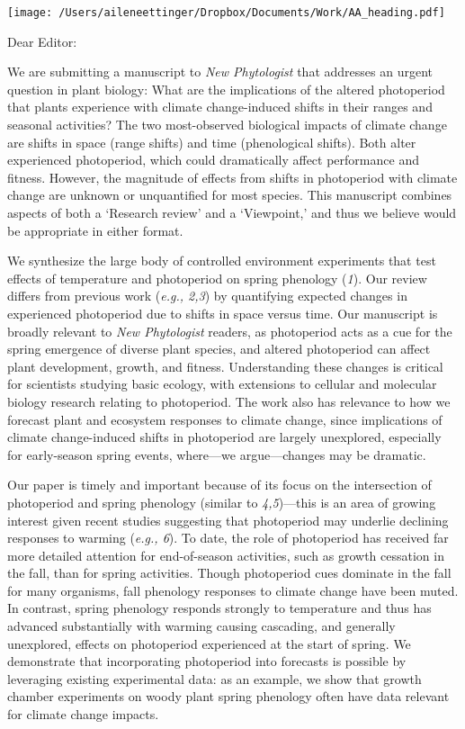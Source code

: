 \documentclass[10.5pt,a4paper]{letter}
\begin{document}
\begin{letter}{}
\texttt{[image: /Users/aileneettinger/Dropbox/Documents/Work/AA\_heading.pdf]}

\opening{Dear Editor:}
We are submitting a manuscript to \emph{New Phytologist} that addresses an urgent question in plant biology: What are the implications
of the altered photoperiod that plants experience with climate change-induced shifts in their ranges and seasonal activities? The two most-observed biological impacts of climate change are shifts in space (range shifts) and time (phenological shifts). Both alter experienced photoperiod, which could dramatically affect performance and fitness. However, the magnitude of effects from shifts in photoperiod with climate change are unknown or unquantified for most species. This manuscript combines aspects of both a `Research review' and a `Viewpoint,' and thus we believe would be appropriate in either format.
\par We synthesize the large body of controlled environment experiments that test effects of temperature and photoperiod on spring phenology (\emph{1}). Our review differs from previous work  (\emph{e.g., 2,3}) by quantifying expected changes in experienced photoperiod due to shifts in space versus time. Our manuscript is  broadly relevant to \emph{New Phytologist} readers, as photoperiod acts as a cue for the spring emergence of diverse plant species, and altered photoperiod can affect plant development, growth, and fitness. Understanding these changes is critical for scientists studying basic ecology, with extensions to cellular and molecular biology research relating to photoperiod. The work also has relevance to how we forecast plant and ecosystem responses to climate change, since implications of climate change-induced shifts in photoperiod are largely unexplored, especially for early-season spring events, where---we argue---changes may be dramatic.

\par Our paper is timely and important because of its focus on the intersection of photoperiod and spring phenology (similar to \emph{4,5})---this is an area of growing interest given recent studies suggesting that photoperiod may underlie declining responses to warming (\emph{e.g., 6}). To date, the role of photoperiod has received far more detailed attention for end-of-season activities, such as growth cessation in the fall, than for spring activities. Though photoperiod cues dominate in the fall for many organisms, fall phenology responses to climate change have been muted. In contrast, spring phenology responds strongly to temperature and thus has advanced substantially with warming causing cascading, and generally unexplored, effects on photoperiod experienced at the start of spring. We demonstrate that incorporating photoperiod into forecasts is possible by leveraging existing experimental data: as an example, we show that growth chamber experiments on woody plant spring phenology often have data relevant for climate change impacts. 


\end{letter}
\end{document}
